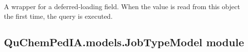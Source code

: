 \documentclass[letterpaper,10pt,english]{sphinxmanual}
\begin{document}
\begin{fulllineitems}

\begin{fulllineitems}
\label{\detokenize{QuChemPedIA.models:QuChemPedIA.models.ImportRuleModel.ImportRule.objects}}
\end{fulllineitems}


\begin{fulllineitems}
\label{\detokenize{QuChemPedIA.models:QuChemPedIA.models.ImportRuleModel.ImportRule.rule}}
A wrapper for a deferred-loading field. When the value is read from this
object the first time, the query is executed.

\end{fulllineitems}


\end{fulllineitems}



\subsection{QuChemPedIA.models.JobTypeModel module}
\label{\detokenize{QuChemPedIA.models:module-QuChemPedIA.models.JobTypeModel}}\label{\detokenize{QuChemPedIA.models:quchempedia-models-jobtypemodel-module}}
\end{document}
